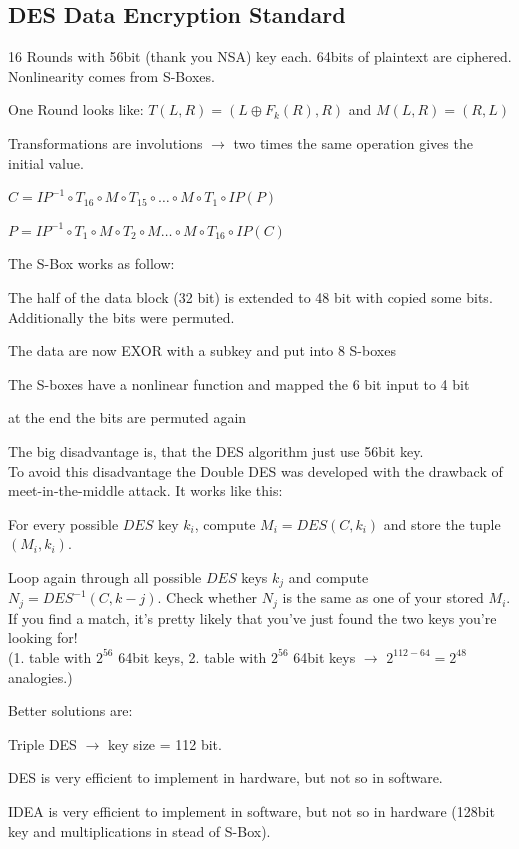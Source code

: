 \subsection{DES Data Encryption Standard}
\begin{minipage}{10cm}
\begin{liste}
\item 16 Rounds with 56bit (thank you NSA) key each. 64bits of plaintext are ciphered. Nonlinearity comes from S-Boxes.
\item One Round looks like: $T(L,R)=(L \oplus F_k(R),R)$ and $M(L,R)=(R,L)$
\item Transformations are involutions $\to$ two times the same operation gives the initial value.
\item $C=IP^{-1} \circ T_{16} \circ M \circ T_{15} \circ \ldots \circ M \circ T_1 \circ IP(P)$
\item $P=IP^{-1} \circ T_1 \circ  M \circ T_2 \circ M \ldots \circ M \circ T_{16} \circ IP(C)$
\end{liste}
The S-Box works as follow:
\begin{liste}
\item The half of the data block (32 bit) is extended to 48 bit with copied some bits. Additionally the bits were permuted.
\item The data are now EXOR with a subkey and put into 8 S-boxes
\item The S-boxes have a nonlinear function and mapped the 6 bit input to 4 bit
\item at the end the bits are permuted again
\end{liste}
The big disadvantage is, that the DES algorithm just use 56bit key.\\
To avoid this disadvantage the Double DES was developed with the drawback of meet-in-the-middle attack. It works like this:
\begin{aufzaehlung}
    \item For every possible $DES$ key $k_i$, compute $M_i = DES(C,k_i)$ and store the tuple $(M_i, k_i)$.\\
    \item Loop again through all possible $DES$ keys $k_j$ and compute $N_j = DES^{-1}(C,k-j)$. Check whether $N_j$ 
    is the same as one of your stored $M_i$. If you find a match, it's pretty likely that you've just 
    found the two keys you're looking for!\\
    (1. table with $2^{56}$ 64bit keys, 2. table with $2^{56}$ 64bit keys $\to$ $2^{112-64} = 2^{48}$ analogies.)\\
\end{aufzaehlung}
Better solutions are:
\begin{liste}
\item Triple DES $\to$ key size = 112 bit.
\item DES is very efficient to implement in hardware, but not so in software.
\item IDEA is very efficient to implement in software, but not so in hardware (128bit key and multiplications in stead of S-Box).
\end{liste}



\end{minipage}
